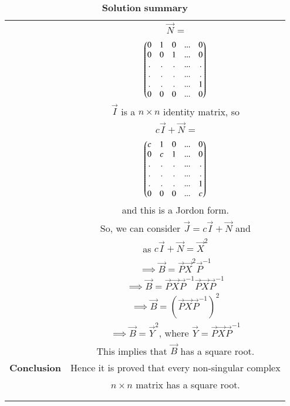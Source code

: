 \documentclass[journal,12pt,onecolumn]{IEEEtran}
\renewcommand\thesection{\arabic{section}}
\begin{document}
\begin{longtable}{|c|c|}
& $\vec{N}$ = \\
& $\begin{pmatrix}0 & 1 &0 &...& 0\\0 & 0 & 1& ...& 0\\.&.&.&...&.\\.&.&.&...&.\\.&.&.&...&1\\0 & 0 &0 &...& 0\end{pmatrix}$\\
& $\vec{I}$ is a $n \times n$ identity matrix, so \\
& $c\vec{I}+\vec{N}$ = \\
& $\begin{pmatrix}c & 1 &0 &...& 0\\0 & c & 1& ...& 0\\.&.&.&...&.\\.&.&.&...&.\\.&.&.&...&1\\0 & 0 &0 &...& c\end{pmatrix}$\\
& and this is a Jordon form.\\
& So, we can consider $\vec{J} = c\vec{I}+\vec{N}$ and \\
& as $c\vec{I}+\vec{N}= \vec{X}^2$ \\
& $\implies \vec{B}=\vec{P}\vec{X}^2\vec{P}^{-1}$\\
& $\implies \vec{B}=\vec{P}\vec{X}\vec{P}^{-1}\vec{P}\vec{X}\vec{P}^{-1}$\\
& $\implies \vec{B}=(\vec{P}\vec{X}\vec{P}^{-1})^2$\\
& $\implies \vec{B}=\vec{Y}^2$, where $\vec{Y} = \vec{P}\vec{X}\vec{P}^{-1}$\\
& This implies that $\vec{B}$ has a square root.\\
\hline
\textbf{Conclusion} & Hence it is proved that every non-singular complex \\
& $n \times n$ matrix has a square root.\\
& \\
\hline
\caption{$\textbf{Solution summary}$}
\label{table:1}
\end{longtable}
\end{document}
